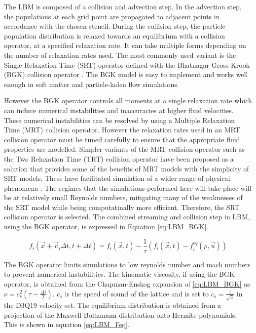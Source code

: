 The LBM is composed of a collision and advection step. In the advection step, the populations at each grid point are propagated to adjacent points in accordance 
with the chosen stencil. During the collision step, the particle population distribution is relaxed towards an equilibrium with a collision operator, at a 
specified relaxation rate. It can take multiple forms depending on the number of
relaxation rates used. The most commonly used variant is the Single Relaxation Time (SRT) operator defined with the Bhatnagar-Gross-Krook (BGK) 
collision operator \cite{bhatnagar_model_1954, qian_lattice_1992}. The BGK model is easy to implement and works well enough in soft matter and
particle-laden flow simulations.

However the BGK operator controls all moments at a single relaxation rate which can induce numerical instabilities and inaccuracies
at higher fluid velocities. \cite{liu_simulation_2023, adhikari_fluctuating_2005} These numerical instabilities can be resolved by using
a Multiple Relaxation Time (MRT) collision operator. However the relaxation rates used in an MRT collision operator must be tuned carefully
to ensure that the appropriate fluid properties are modelled. Simpler variants of the MRT collision operator such as the Two Relaxation Time (TRT)
collision operator have been proposed as a solution that provides some of the benefits of MRT models with the simplicity of SRT models. These 
have facilitated simulation of a wider range of physical phenomena \cite{adhikari_fluctuating_2005, liu_simulation_2023}. The regimes that the simulations 
performed here will take place will be at relatively small Reynolds numbers, mitigating many of the weaknesses of the SRT model while being computatinally
more efficient. Therefore, the SRT collision operator is selected. The combined streaming and 
collision step in LBM, using the BGK operator, is expressed in Equation \ref{eq:LBM_BGK}.

\begin{equation}
    f_{i}(\vec{x} + \vec{c}_{i}\Delta t, t + \Delta t) = f_{i}(\vec{x}, t) - \frac{1}{\tau}(f_{i}(\vec{x}, t) 
    - f_{i}^{eq}(\rho, \vec{u}))
    \label{eq:LBM_BGK}
\end{equation}

The BGK operator limits simulations to low reynolds number and mach numbers to prevent numerical instabilities. 
\cite{qian_lattice_1992} The kinematic viscosity, if using the BGK operator, is obtained from the Chapman-Enskog expansion of \ref{eq:LBM_BGK}
as $\nu = c_s^2(\tau - \frac{\Delta t}{2})$. $c_s$ is the speed of sound of the lattice and is set to $c_s = \frac{1}{\sqrt{3}}$ in the D3Q19 velocity set. 
The equilibrium distribution is obtained from a projection of the 
Maxwell-Boltzmann distribution onto Hermite polynomials. \cite{he_theory_1997, succi_lattice_2018} This is shown in equation 
\ref{eq:LBM_Feq}.


